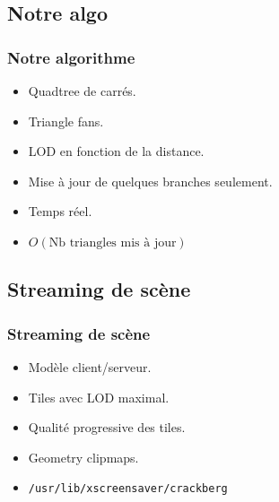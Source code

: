 \documentclass{beamer}
\begin{document}
\subsection{Notre algo}
\begin{frame}
  \frametitle{Notre algorithme}
  \begin{itemize}
  \item Quadtree de carrés.
  \item Triangle fans.
  \item LOD en fonction de la distance.
  \item Mise à jour de quelques branches seulement.
  \item Temps réel.
  \item $O(\text{Nb triangles mis à jour})$
  \end{itemize}
\end{frame}

\subsection{Streaming de scène}
\begin{frame}
  \frametitle{Streaming de scène}
  \begin{itemize}
  \item Modèle client/serveur.
  \item Tiles avec LOD maximal.
  \item Qualité progressive des tiles.
  \item Geometry clipmaps.
  \item \texttt{/usr/lib/xscreensaver/crackberg}
  \end{itemize}
\end{frame}


\end{document}
